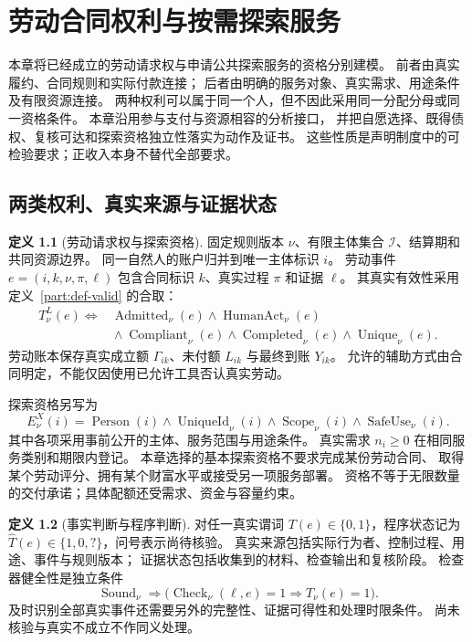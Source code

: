 \documentclass[UTF8,12pt,a4paper,openany,fontset=none,zihao=false]{ctexrep}
\theoremstyle{definition}
\newtheorem{definition}{定义}[chapter]
\newcommand{\1}{\mathbf 1}
\begin{document}
\chapter{劳动合同权利与按需探索服务}
\label{integrated:labour-access}
\label{rights:chapter}

本章将已经成立的劳动请求权与申请公共探索服务的资格分别建模。
前者由真实履约、合同规则和实际付款连接；
后者由明确的服务对象、真实需求、用途条件及有限资源连接。
两种权利可以属于同一个人，但不因此采用同一分配分母或同一资格条件。
本章沿用参与支付与资源相容的分析接口\cite{InternalEconomics}，
并把自愿选择、既得债权、复核可达和探索资格独立性落实为动作及证书。
这些性质是声明制度中的可检验要求；正收入本身不替代全部要求。

\section{两类权利、真实来源与证据状态}

\begin{definition}[劳动请求权与探索资格]
\label{rights:two-objects}
固定规则版本 \(\nu\)、有限主体集合 \(\mathcal I\)、结算期和共同资源边界。
同一自然人的账户归并到唯一主体标识 \(i\)。
劳动事件 \(e=(i,k,\nu,\pi,\ell)\) 包含合同标识 \(k\)、真实过程 \(\pi\) 和证据 \(\ell\)。
其真实有效性采用定义~\ref{part:def-valid} 的合取：
\[
\begin{aligned}
T^L_\nu(e)\Longleftrightarrow{}&
\operatorname{Admitted}_\nu(e)\land\operatorname{HumanAct}_\nu(e)\\
&{}\land\operatorname{Compliant}_\nu(e)
\land\operatorname{Completed}_\nu(e)\land\operatorname{Unique}_\nu(e).
\end{aligned}
\]
劳动账本保存真实成立额 \(\Gamma_{ik}\)、未付额 \(L_{ik}\) 与最终到账 \(Y_{ik}\)。
允许的辅助方式由合同明定，不能仅因使用已允许工具否认真实劳动。

探索资格另写为
\[
E^X_\nu(i)=
\operatorname{Person}(i)\land\operatorname{UniqueId}_\nu(i)
\land\operatorname{Scope}_\nu(i)\land\operatorname{SafeUse}_\nu(i).
\]
其中各项采用事前公开的主体、服务范围与用途条件。
真实需求 \(n_i\ge0\) 在相同服务类别和期限内登记。
本章选择的基本探索资格不要求完成某份劳动合同、
取得某个劳动评分、拥有某个财富水平或接受另一项服务部署。
资格不等于无限数量的交付承诺；具体配额还受需求、资金与容量约束。
\end{definition}

\begin{definition}[事实判断与程序判断]
\label{rights:source-status}
对任一真实谓词 \(T(e)\in\{0,1\}\)，程序状态记为
\(\widehat T(e)\in\{1,0,?\}\)，问号表示尚待核验。
真实来源包括实际行为者、控制过程、用途、事件与规则版本；
证据状态包括收集到的材料、检查输出和复核阶段。
检查器健全性是独立条件
\[
\operatorname{Sound}_\nu
\Longrightarrow
\bigl(\operatorname{Check}_\nu(\ell,e)=1\Longrightarrow T_\nu(e)=1\bigr).
\]
及时识别全部真实事件还需要另外的完整性、证据可得性和处理时限条件。
尚未核验与真实不成立不作同义处理。
\end{definition}
\end{document}
